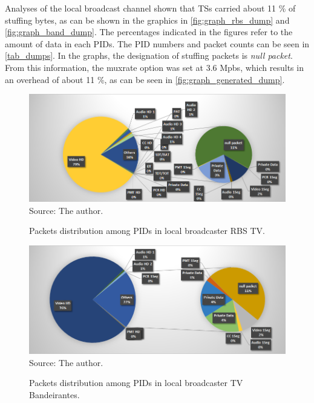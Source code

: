 \documentclass[
	12pt,				%
	openright,			%
	twoside,			%
	a4paper,			%
	brazil,
	french,				%
	english
	]{abntex2}
\begin{document}
Analyses of the local broadcast channel shown that TSs carried about 11 \% of stuffing bytes, as can be shown in the graphics in \autoref{fig:graph_rbs_dump} and \autoref{fig:graph_band_dump}. The percentages indicated in the figures refer to the amount of data in each PIDs. The PID numbers and packet counts can be seen in \autoref{tab_dumps}. In the graphs, the designation of stuffing packets is \textit{null packet}. From this information, the muxrate option was set at 3.6 Mpbs, which results in an overhead of about 11 \%, as can be seen in \autoref{fig:graph_generated_dump}.

\begin{figure}[!h]
\centering
\caption{Packets distribution among PIDs in local broadcaster RBS TV.}
\includegraphics[width=0.9\linewidth]{figuras/graph_rbs_dump.png}
\\Source: The author.
\label{fig:graph_rbs_dump}
\end{figure}

\begin{figure}[!h]
\centering
\caption{Packets distribution among PIDs in local broadcaster TV Bandeirantes.}
\includegraphics[width=0.9\linewidth]{figuras/graph_band_dump.png}
\\Source: The author.
\label{fig:graph_band_dump}
\end{figure}
\end{document}
